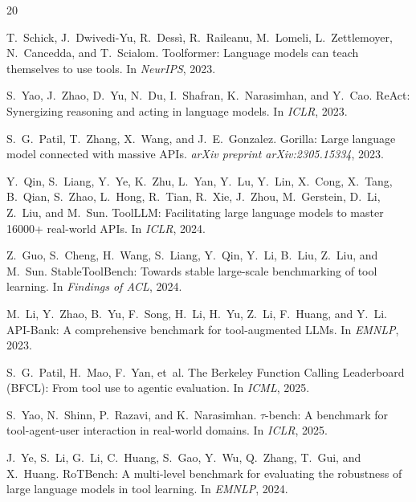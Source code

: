 \documentclass{article}
\begin{document}
{\footnotesize

\begin{thebibliography}{20}

T.~Schick, J.~Dwivedi-Yu, R.~Dess{\`i}, R.~Raileanu, M.~Lomeli, L.~Zettlemoyer, N.~Cancedda, and T.~Scialom.
\newblock Toolformer: Language models can teach themselves to use tools.
\newblock In \emph{NeurIPS}, 2023.

S.~Yao, J.~Zhao, D.~Yu, N.~Du, I.~Shafran, K.~Narasimhan, and Y.~Cao.
\newblock ReAct: Synergizing reasoning and acting in language models.
\newblock In \emph{ICLR}, 2023.

S.~G.~Patil, T.~Zhang, X.~Wang, and J.~E.~Gonzalez.
\newblock Gorilla: Large language model connected with massive APIs.
\newblock \emph{arXiv preprint arXiv:2305.15334}, 2023.

Y.~Qin, S.~Liang, Y.~Ye, K.~Zhu, L.~Yan, Y.~Lu, Y.~Lin, X.~Cong, X.~Tang, B.~Qian, S.~Zhao, L.~Hong, R.~Tian, R.~Xie, J.~Zhou, M.~Gerstein, D.~Li, Z.~Liu, and M.~Sun.
\newblock ToolLLM: Facilitating large language models to master 16000+ real-world APIs.
\newblock In \emph{ICLR}, 2024.

Z.~Guo, S.~Cheng, H.~Wang, S.~Liang, Y.~Qin, Y.~Li, B.~Liu, Z.~Liu, and M.~Sun.
\newblock StableToolBench: Towards stable large-scale benchmarking of tool learning.
\newblock In \emph{Findings of ACL}, 2024.

M.~Li, Y.~Zhao, B.~Yu, F.~Song, H.~Li, H.~Yu, Z.~Li, F.~Huang, and Y.~Li.
\newblock API-Bank: A comprehensive benchmark for tool-augmented LLMs.
\newblock In \emph{EMNLP}, 2023.

S.~G.~Patil, H.~Mao, F.~Yan, et~al.
\newblock The Berkeley Function Calling Leaderboard (BFCL): From tool use to agentic evaluation.
\newblock In \emph{ICML}, 2025.

S.~Yao, N.~Shinn, P.~Razavi, and K.~Narasimhan.
\newblock $\tau$-bench: A benchmark for tool-agent-user interaction in real-world domains.
\newblock In \emph{ICLR}, 2025.

J.~Ye, S.~Li, G.~Li, C.~Huang, S.~Gao, Y.~Wu, Q.~Zhang, T.~Gui, and X.~Huang.
\newblock RoTBench: A multi-level benchmark for evaluating the robustness of large language models in tool learning.
\newblock In \emph{EMNLP}, 2024.


\end{thebibliography}}
\end{document}
